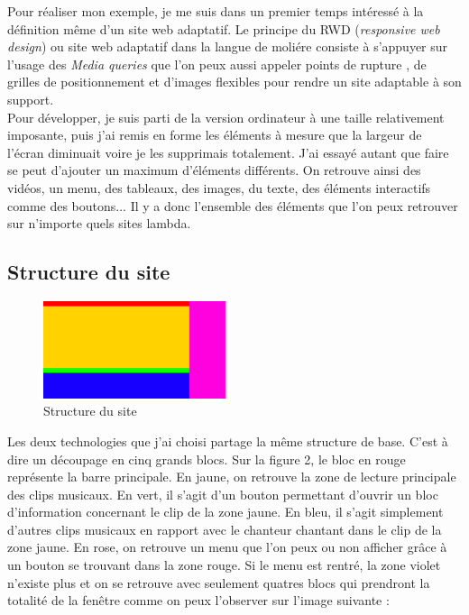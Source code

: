\documentclass{article}
\begin{document}
Pour r\'ealiser mon exemple, je me suis dans un premier temps int\'eress\'e \`a la d\'efinition m\^eme d'un site web adaptatif. Le principe du RWD (\textit{responsive web design}) ou site web adaptatif dans la langue de moli\'ere consiste \`a s'appuyer sur l'usage des \textit{Media queries} que l'on peux aussi appeler \og points de rupture \fg , de grilles de positionnement et d'images flexibles pour rendre un site adaptable \`a son support.\\
Pour d\'evelopper, je suis parti de la version ordinateur \`a une taille relativement imposante, puis j'ai remis en forme les \'el\'ements \`a mesure que la largeur de l'\'ecran diminuait voire je les supprimais totalement. J'ai essay\'e autant que faire se peut d'ajouter un maximum d'\'el\'ements diff\'erents. On retrouve ainsi des vid\'eos, un menu, des tableaux, des images, du texte, des \'el\'ements interactifs comme des boutons... Il y a donc l'ensemble des \'el\'ements que l'on peux retrouver sur n'importe quels sites lambda. \\

\subsection{Structure du site}

\begin{figure}
  \vspace{-20pt}
  \begin{center}
    \includegraphics[width=0.48\textwidth]{p3}
  \end{center}
  \vspace{-20pt}
  \caption{Structure du site}
  \vspace{-10pt}
\end{figure}

Les deux technologies que j'ai choisi partage la m\^eme structure de base. C'est \`a dire un d\'ecoupage en cinq grands blocs. Sur la figure 2, le bloc en rouge repr\'esente la barre principale. En jaune, on retrouve la zone de lecture principale des clips musicaux. En vert, il s'agit d'un bouton permettant d'ouvrir un bloc d'information concernant le clip de la zone jaune. En bleu, il s'agit simplement d'autres clips musicaux en rapport avec le chanteur chantant dans le clip de la zone jaune. En rose, on retrouve un menu que l'on peux ou non afficher gr\^ace \`a un bouton se trouvant dans la zone rouge. Si le menu est rentr\'e, la zone violet n'existe plus et on se retrouve avec seulement quatres blocs qui prendront la totalit\'e de la fen\^etre comme on peux l'observer sur l'image suivante :\\
\end{document}
